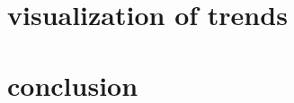 \documentclass[11pt]{report}%
\begin{document}
\chapter{visualization of trends}

\chapter{conclusion}

%
%
\end{document}
